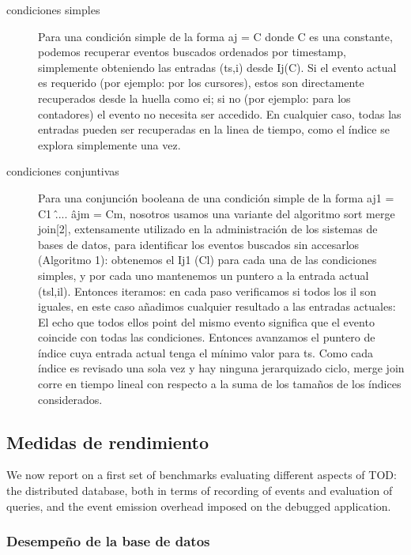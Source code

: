 \documentclass[12pt,a4paper]{report}
\begin{document}
\begin{description}
	\item[condiciones simples] Para una condición simple de la forma aj = C donde C es una constante, podemos recuperar eventos buscados ordenados por timestamp, simplemente obteniendo las entradas (ts,i) desde Ij(C).  Si el evento actual es requerido (por ejemplo: por los cursores), estos son directamente recuperados desde la huella como ei; si no (por ejemplo: para los contadores) el evento no necesita ser accedido.  En cualquier caso, todas las entradas pueden ser recuperadas en la linea de tiempo, como el índice se explora simplemente una vez.

	\item[condiciones conjuntivas] Para una conjunción booleana de una condición simple de la forma aj1 = C1 \^ .... \^ ajm = Cm, nosotros usamos una variante del algoritmo sort merge join[2], extensamente utilizado en la administración de los sistemas de bases de datos, para identificar los eventos buscados sin accesarlos (Algoritmo 1):  obtenemos el Ij1 (Cl) para cada una de las condiciones simples, y por cada uno mantenemos un puntero a la entrada actual (tsl,il).  Entonces iteramos: en cada paso verificamos si todos los il son iguales, en este caso añadimos cualquier resultado a las entradas actuales:  El echo que todos ellos point del mismo evento significa que el evento coincide con todas las condiciones.  Entonces avanzamos el puntero de índice cuya entrada actual tenga el mínimo valor para ts.  Como cada índice es revisado una sola vez y hay ninguna jerarquizado ciclo, merge join corre en tiempo lineal con respecto a la suma de los tamaños de los índices considerados.
\end{description}

		\subsection{Medidas de rendimiento}

We now report on a first set of benchmarks evaluating different aspects of TOD: the distributed database, both in terms of recording of events and evaluation of queries, and the event emission overhead imposed on the debugged application.

			\subsubsection{Desempeño de la base de datos}
\end{document}
